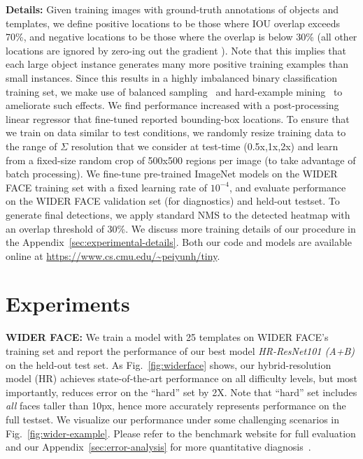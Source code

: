 \documentclass[10pt,twocolumn,letterpaper]{article}
\begin{document}
{\bf Details:} Given training images with ground-truth annotations of objects and templates, we define positive locations to be those where IOU overlap exceeds 70\%, and negative locations to be those where the overlap is below 30\% (all other locations are ignored by zero-ing out the gradient ). Note that this implies that each large object instance generates many more positive training examples than small instances. Since this results in a highly imbalanced binary classification training set, we make use of balanced sampling~\cite{girshick2014rich} and hard-example mining~\cite{shrivastava2016training} to ameliorate such effects. We find performance increased with a post-processing linear regressor that fine-tuned reported bounding-box locations. To ensure that we train on data similar to test conditions, we randomly resize training data to the range of $\Sigma$ resolution that we consider at test-time (0.5x,1x,2x) and learn from a fixed-size random crop of 500x500 regions per image (to take advantage of batch processing). We fine-tune pre-trained ImageNet models on the WIDER FACE training set with a fixed learning rate of $10^{-4}$, and evaluate performance on the WIDER FACE validation set (for diagnostics) and held-out testset. To generate final detections, we apply standard NMS to the detected heatmap with an overlap threshold of 30\%. We discuss more training details of our procedure in the Appendix~\ref{sec:experimental-details}. Both our code and models are available online at {\small \url{https://www.cs.cmu.edu/~peiyunh/tiny}}. 










\section{Experiments}
\label{sec:exp}

{\bf WIDER FACE:} We train a model with 25 templates on WIDER FACE's training set and report the performance of our best model {\em HR-ResNet101 (A+B)} on the held-out test set. As Fig.~\ref{fig:widerface} shows, our hybrid-resolution model (HR) achieves state-of-the-art performance on all difficulty levels, but most importantly, reduces error on the ``hard'' set by 2X. Note that ``hard'' set includes {\em all} faces taller than 10px, hence more accurately represents performance on the full testset. We visualize our performance under some challenging scenarios in Fig.~\ref{fig:wider-example}. Please refer to the benchmark website for full evaluation and our Appendix~\ref{sec:error-analysis} for more quantitative diagnosis~\cite{hoiem2012diagnosing}.  
\end{document}
